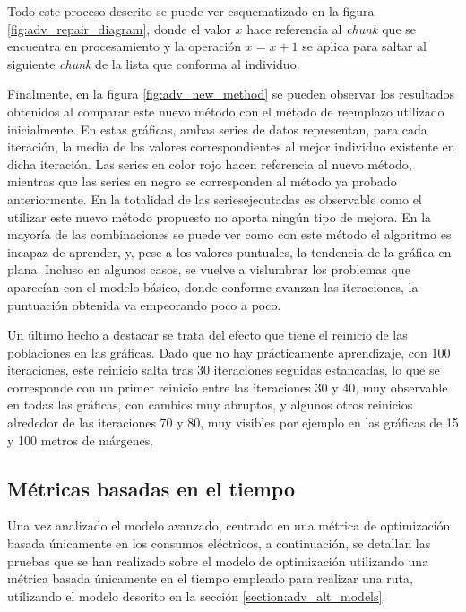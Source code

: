 \documentclass[11pt,spanish,listoffigures,listoftables]{tfgetsinf}
\begin{document}
Todo este proceso descrito se puede ver esquematizado en la figura \ref{fig:adv_repair_diagram}, donde el valor $x$ hace referencia al \textit{chunk} que se encuentra en procesamiento y la operación $x=x+1$ se aplica para saltar al siguiente \textit{chunk} de la lista que conforma al individuo.

Finalmente, en la figura \ref{fig:adv_new_method} se pueden observar los resultados obtenidos al comparar este nuevo método con el método de reemplazo utilizado inicialmente. En estas gráficas, ambas series de datos representan, para cada iteración, la media de los valores correspondientes al mejor individuo existente en dicha iteración. Las series en color rojo hacen referencia al nuevo método, mientras que las series en negro se corresponden al método ya probado anteriormente. En la totalidad de las series\footnotemark  ejecutadas es observable como el utilizar este nuevo método propuesto no aporta ningún tipo de mejora. En la mayoría de las combinaciones se puede ver como con este método el algoritmo es incapaz de aprender, y, pese a los valores puntuales, la tendencia de la gráfica en plana. Incluso en algunos casos, se vuelve a vislumbrar los problemas que aparecían con el modelo básico, donde conforme avanzan las iteraciones, la puntuación obtenida va empeorando poco a poco.

Un último hecho a destacar se trata del efecto que tiene el reinicio de las poblaciones en las gráficas. Dado que no hay prácticamente aprendizaje, con 100 iteraciones, este reinicio salta tras 30 iteraciones seguidas estancadas, lo que se corresponde con un primer reinicio entre las iteraciones 30 y 40, muy observable en todas las gráficas, con cambios muy abruptos, y algunos otros reinicios alrededor de las iteraciones 70 y 80, muy visibles por ejemplo en las gráficas de 15 y 100 metros de márgenes.


\newpage
\subsection{Métricas basadas en el tiempo}
Una vez analizado el modelo avanzado, centrado en una métrica de optimización basada únicamente en los consumos eléctricos, a continuación, se detallan las pruebas que se han realizado sobre el modelo de optimización utilizando una métrica basada únicamente en el tiempo empleado para realizar una ruta, utilizando el modelo descrito en la sección \ref{section:adv_alt_models}.
\end{document}
